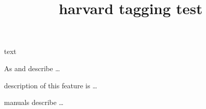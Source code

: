 \documentclass{article}
\title{harvard tagging test}
\begin{document}
text \cite[postfix]{inbook-full}

As  and  describe \ldots

 description of this feature is \ldots

manuals  describe \ldots

\citeyear{inbook-full}




\end{document}

